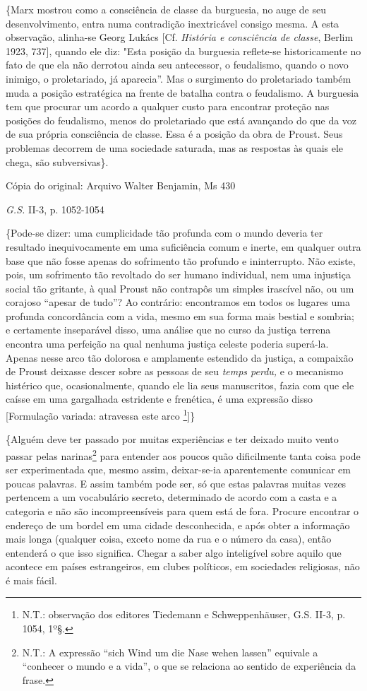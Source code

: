 \{Marx mostrou como a consciência de classe da burguesia, no auge de seu
desenvolvimento, entra numa contradição inextricável consigo mesma. A
esta observação, alinha-se Georg Lukács {[}Cf. \emph{História e
consciência de classe}, Berlim 1923, 737{]}, quando ele diz: "Esta
posição da burguesia reflete-se historicamente no fato de que ela não
derrotou ainda seu antecessor, o feudalismo, quando o novo inimigo, o
proletariado, já aparecia''. Mas o surgimento do proletariado também
muda a posição estratégica na frente de batalha contra o feudalismo. A
burguesia tem que procurar um acordo a qualquer custo para encontrar
proteção nas posições do feudalismo, menos do proletariado que está
avançando do que da voz de sua própria consciência de classe. Essa é a
posição da obra de Proust. Seus problemas decorrem de uma sociedade
saturada, mas as respostas às quais ele chega, são subversivas\}.

Cópia do original: Arquivo Walter Benjamin, Ms 430

\emph{G.S.} II-3, p. 1052-1054

\{Pode-se dizer: uma cumplicidade tão profunda com o mundo deveria ter
resultado inequivocamente em uma suficiência comum e inerte, em qualquer
outra base que não fosse apenas do sofrimento tão profundo e
ininterrupto. Não existe, pois, um sofrimento tão revoltado do ser
humano individual, nem uma injustiça social tão gritante, à qual Proust
não contrapôs um simples irascível não, ou um corajoso ``apesar de
tudo''? Ao contrário: encontramos em todos os lugares uma profunda
concordância com a vida, mesmo em sua forma mais bestial e sombria; e
certamente inseparável disso, uma análise que no curso da justiça
terrena encontra uma perfeição na qual nenhuma justiça celeste poderia
superá-la. Apenas nesse arco tão dolorosa e amplamente estendido da
justiça, a compaixão de Proust deixasse descer sobre as pessoas de seu
\emph{temps perdu,} e o mecanismo histérico que, ocasionalmente, quando
ele lia seus manuscritos, fazia com que ele caísse em uma gargalhada
estridente e frenética, é uma expressão disso {[}Formulação variada:
atravessa este arco \footnote{N.T.: observação dos editores Tiedemann e
  Schweppenhäuser, G.S. II-3, p. 1054, 1º§.}{]}\}

\{Alguém deve ter passado por muitas experiências e ter deixado muito
vento passar pelas narinas\footnote{N.T.: A expressão ``sich Wind um die
  Nase wehen lassen'' equivale a ``conhecer o mundo e a vida'', o que se
  relaciona ao sentido de experiência da frase.} para entender aos
poucos quão dificilmente tanta coisa pode ser experimentada que, mesmo
assim, deixar-se-ia aparentemente comunicar em poucas palavras. E assim
também pode ser, só que estas palavras muitas vezes pertencem a um
vocabulário secreto, determinado de acordo com a casta e a categoria e
não são incompreensíveis para quem está de fora. Procure encontrar o
endereço de um bordel em uma cidade desconhecida, e após obter a
informação mais longa (qualquer coisa, exceto nome da rua e o número da
casa), então entenderá o que isso significa. Chegar a saber algo
inteligível sobre aquilo que acontece em países estrangeiros, em clubes
políticos, em sociedades religiosas, não é mais fácil.

